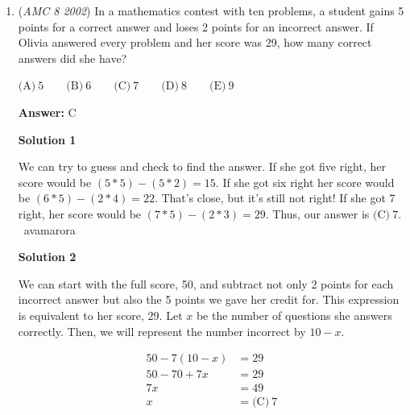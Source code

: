 \begin{enumerate}
 Plugging into the answer choices, the only that works is $\boxed{\textbf{(E)}\ X+Y=Z}$.

 



\textbf{Solution 2}

Looking at the diagram, we notice that three right isosceles triangles on one right triangle reminds us of the Pythagorean theorem, since each right isosceles triangle is actually half of a square. Each square's area represents a side length squared, so the squares on the legs of the right triangle adds to the square on the hypotenuse. This gives $2X+2Y=2Z$. Then, dividing by 2 we get $X+Y=Z$, which is one of the answer choices. Since there can only be one correct answer, and there is already one, we see that the answer must be $\boxed{\textbf{(E)}\ X+Y=Z}$.

 


	\item (\textit{AMC 8 2002}) In a mathematics contest with ten problems, a student gains 5 points for a correct answer and loses 2 points for an incorrect answer. If Olivia answered every problem and her score was 29, how many correct answers did she have?


 $\text{(A)}\ 5 \qquad \text{(B)}\ 6 \qquad \text{(C)}\ 7 \qquad \text{(D)}\ 8 \qquad \text{(E)}\ 9$

 \textbf{Answer: }C



\textbf{Solution 1}

We can try to guess and check to find the answer. If she got five right, her score would be $(5*5)-(5*2)=15$. If she got six right her score would be $(6*5)-(2*4)=22$. That's close, but it's still not right! If she got 7 right, her score would be $(7*5)-(2*3)=29$. Thus, our answer is $\boxed{\text{(C)}\ 7}$. ~avamarora

 



\textbf{Solution 2}

We can start with the full score, 50, and subtract not only 2 points for each incorrect answer but also the 5 points we gave her credit for. This expression is equivalent to her score, 29. Let $x$ be the number of questions she answers correctly. Then, we will represent the number incorrect by $10-x$.

 
 \begin{align*} 50-7(10-x)&=29\\ 50-70+7x&=29\\ 7x&=49\\ x&=\boxed{\text{(C)}\ 7} \end{align*}






\end{enumerate}
